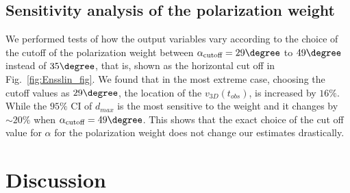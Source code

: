\documentclass[ucdthesis.tex]{subfiles}
\begin{document}
    \subsection{Sensitivity analysis of the polarization weight}
    \label{sec:sensitivityTests}
    We performed tests of how the output variables vary according to the
    choice of the cutoff of the polarization weight between
    $\alpha_{\text{cutoff}} =
    29 \degree$ to $49\degree$ instead of $35 \degree$, that is, shown as the
    horizontal cut off in Fig.~\ref{fig:Ensslin_fig}.
    We found that in the most extreme case, choosing the cutoff values as $29
    \degree$, the location of the $v_{3D}(t_{obs})$, is
    increased by $16 \%$. While the $95\%$ CI of $d_{max}$ is
    the most sensitive to the weight and it changes by
    $\sim20 \%$ when $\alpha_{\text{cutoff}} = 49 \degree$. 
    This shows that the exact choice of the cut off value for $\alpha$ for the
    polarization weight does not change our estimates drastically.
    
    
    \section{Discussion}
\end{document}
